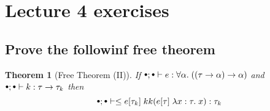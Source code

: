 \documentclass[a4paper,10pt,fleqn]{article}
\newcommand{\mtenv}{{\raisebox{1.5pt}{$\scriptstyle\bullet$}}}
\newcommand{\tlabs}[3]{\ensuremath{\lambda #1 : #2 . \; #3}}
\newcommand{\tarrow}[2]{\ensuremath{ #1 \rightarrow #2}}
\newtheorem*{theorem}{Theorem}
\begin{document}
\section*{Lecture 4 exercises}
\subsection*{Prove the followinf free theorem}  
\begin{theorem}[Free Theorem (II)]
    If $\mtenv; \mtenv \vdash e : \forall \alpha. \; (\tarrow{(\tarrow{\tau}{\alpha})}{\alpha})$ and 
       $\mtenv; \mtenv \vdash k : \tarrow{\tau}{\tau_k}$ then
    \[
      \mtenv; \mtenv \vdash \leq{e[\tau_k] \; k}{k(e[\tau] \; \tlabs{x}{\tau}{x})} : \tau_k
    \]
  \end{theorem}
\end{document}
